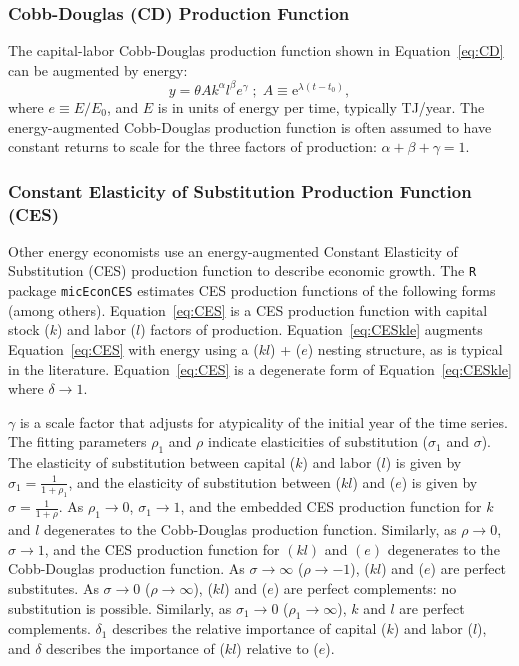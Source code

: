 \documentclass[preprint,authoryear,12pt]{elsarticle}\usepackage[]{graphicx}\usepackage[]{color}
\begin{document}
\subsubsection{Cobb-Douglas (CD) Production Function} 
\label{sec:CDe}

The capital-labor Cobb-Douglas production function shown in Equation~\ref{eq:CD}
can be augmented by energy:
%
\begin{equation} \label{eq:CDe}
  y = \theta A k^\alpha l^\beta e^\gamma \; ; \; A \equiv \mathrm{e}^{\lambda(t-t_0)},
\end{equation}
%
where $e \equiv E/E_0$, and $E$ is in units of energy per time, typically TJ/year. 
The energy-augmented Cobb-Douglas production function 
is often assumed to have constant returns to scale for the three factors 
of production: $\alpha + \beta + \gamma = 1$.


\subsubsection{Constant Elasticity of Substitution Production Function (CES)} 
\label{sec:CES}

Other energy economists use an energy-augmented 
Constant Elasticity of Substitution (CES) production function to 
describe economic growth. The \texttt{R} \citep{R} package 
\texttt{micEconCES} \citep{Henningsen:2011td} estimates CES production 
functions of the following forms (among others).
%
\ceskl{\label{eq:CES}}
%
\ceskle{\label{eq:CESkle}}
%
\noindent Equation~\ref{eq:CES} is a CES production function with 
capital stock ($k$) and labor ($l$) factors of production. 
Equation~\ref{eq:CESkle} augments Equation~\ref{eq:CES} with energy 
using a ($kl$) + ($e$) nesting structure, as is typical in the literature. 
Equation~\ref{eq:CES} is a degenerate form of Equation~\ref{eq:CESkle} 
where $\delta \rightarrow 1$. 

$\gamma$ is a scale factor that adjusts for atypicality 
of the initial year of the time series.
The fitting parameters $\rho_1$ and $\rho$ indicate elasticities 
of substitution ($\sigma_1$ and $\sigma$).
The elasticity of substitution 
between capital ($k$) and labor ($l$) is given by 
$\sigma_1 = \frac{1}{1+\rho_1}$, and
the elasticity of substitution between ($kl$) and ($e$) is given by 
$\sigma = \frac{1}{1+\rho}$. 
As $\rho_1 \rightarrow 0$, $\sigma_1 \rightarrow 1$,
and the embedded CES production function for $k$ and $l$ degenerates 
to the Cobb-Douglas production function.
Similarly, as $\rho \rightarrow 0$, $\sigma \rightarrow 1$,
and the CES production function for $(kl)$ and $(e)$ degenerates 
to the Cobb-Douglas production function.
As $\sigma \rightarrow \infty$ ($\rho \rightarrow -1$), 
($kl$) and ($e$) are perfect substitutes. 
As $\sigma \rightarrow 0$ ($\rho \rightarrow \infty$), 
($kl$) and ($e$) are perfect complements: 
no substitution is possible. Similarly, 
as $\sigma_1 \rightarrow 0$ ($\rho_1 \rightarrow \infty$),
$k$ and $l$ are perfect complements.
$\delta_1$ describes the relative importance of capital ($k$)
and labor ($l$), and
$\delta$ describes the importance of ($kl$) relative to ($e$).
\end{document}
